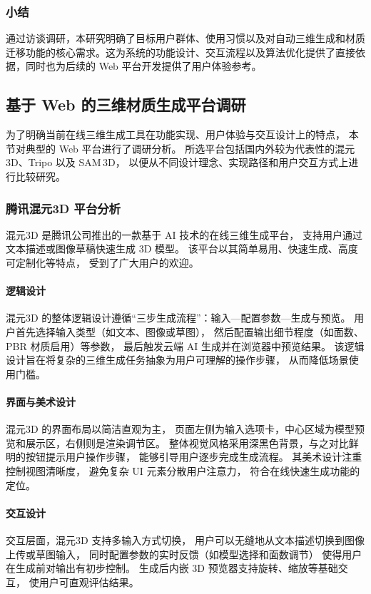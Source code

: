 \subsubsection{小结}

通过访谈调研，本研究明确了目标用户群体、使用习惯以及对自动三维生成和材质迁移功能的核心需求。这为系统的功能设计、交互流程以及算法优化提供了直接依据，同时也为后续的 Web 平台开发提供了用户体验参考。

\subsection{基于 Web 的三维材质生成平台调研}

为了明确当前在线三维生成工具在功能实现、用户体验与交互设计上的特点，  
本节对典型的 Web 平台进行了调研分析。  
所选平台包括国内外较为代表性的混元3D、Tripo 以及 SAM 3D，  
以便从不同设计理念、实现路径和用户交互方式上进行比较研究。  

\subsubsection{腾讯混元3D 平台分析}

混元3D 是腾讯公司推出的一款基于 AI 技术的在线三维生成平台，  
支持用户通过文本描述或图像草稿快速生成 3D 模型。  
该平台以其简单易用、快速生成、高度可定制化等特点，  
受到了广大用户的欢迎。  

\paragraph{逻辑设计}  
混元3D 的整体逻辑设计遵循“三步生成流程”：输入—配置参数—生成与预览。  
用户首先选择输入类型（如文本、图像或草图），  
然后配置输出细节程度（如面数、PBR 材质启用）等参数，  
最后触发云端 AI 生成并在浏览器中预览结果。  
该逻辑设计旨在将复杂的三维生成任务抽象为用户可理解的操作步骤，  
从而降低场景使用门槛。  

\paragraph{界面与美术设计}  
混元3D 的界面布局以简洁直观为主，  
页面左侧为输入选项卡，中心区域为模型预览和展示区，右侧则是渲染调节区。  
整体视觉风格采用深黑色背景，与之对比鲜明的按钮提示用户操作步骤，  
能够引导用户逐步完成生成流程。  
其美术设计注重控制视图清晰度，  
避免复杂 UI 元素分散用户注意力，  
符合在线快速生成功能的定位。  

\paragraph{交互设计}  
交互层面，混元3D 支持多输入方式切换，  
用户可以无缝地从文本描述切换到图像上传或草图输入，  
同时配置参数的实时反馈（如模型选择和面数调节）  
使得用户在生成前对输出有初步控制。  
生成后内嵌 3D 预览器支持旋转、缩放等基础交互，  
使用户可直观评估结果。  


